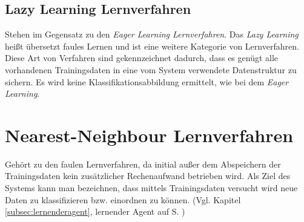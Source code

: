 \documentclass[fontsize=11pt]{scrartcl}
\begin{document}
            \subsection{Lazy Learning Lernverfahren}  
                Stehen im Gegensatz zu den \emph{Eager Learning Lernverfahren}. Das \emph{Lazy Learning} heißt übersetzt faules Lernen und ist eine weitere Kategorie von Lernverfahren. Diese Art von Verfahren sind gekennzeichnet dadurch, dass es genügt alle vorhandenen Trainingsdaten in eine vom System verwendete Datenstruktur zu sichern. Es wird keine Klassifikationsabbildung ermittelt, wie bei dem \emph{Eager Learning}. %
                            
                        
        \section{Nearest-Neighbour Lernverfahren}
            Gehört zu den faulen Lernverfahren, da initial außer dem Abspeichern der Trainingsdaten kein zusätzlicher Rechenaufwand betrieben wird. Als Ziel des Systems kann man bezeichnen, dass mittels Trainingsdaten versucht wird neue Daten zu klassifizieren bzw. einordnen zu können. (Vgl. Kapitel \ref{subsec:lernenderagent}, lernender Agent auf S. \pageref{subsec:lernenderagent})
                        
\end{document}
